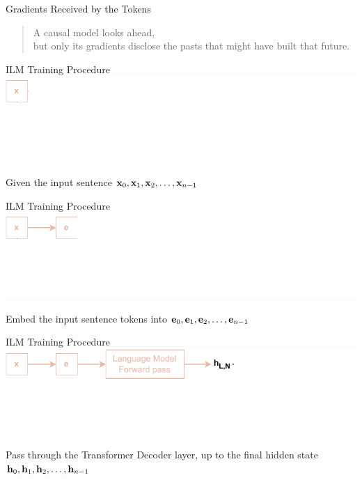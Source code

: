 
\begin{frame}{Gradients Received by the Tokens}
    \begin{quote}
        \centering
        A causal model looks ahead, \\ but only its gradients disclose the pasts that might have built that future.
    \end{quote}
\end{frame}

\begin{frame}{ILM Training Procedure}
    \includegraphics[width=\linewidth]{assets/grad_lm_head_parallelism_0.drawio.pdf}
    \vspace{1.5cm}
    
    \centering
    Given the input sentence $\mathbf{x}_0, \mathbf{x}_1, \mathbf{x}_2, \dots, \mathbf{x}_{n-1}$
\end{frame}

\begin{frame}[noframenumbering]{ILM Training Procedure}
    \includegraphics[width=\linewidth]{assets/grad_lm_head_parallelism_1.drawio.pdf}
    \vspace{1.5cm}
    
    \centering
    Embed the input sentence tokens into $\mathbf{e}_0, \mathbf{e}_1, \mathbf{e}_2, \dots, \mathbf{e}_{n-1}$
\end{frame}

\begin{frame}[noframenumbering]{ILM Training Procedure}
    \includegraphics[width=\linewidth]{assets/grad_lm_head_parallelism_2.drawio.pdf}
    \vspace{1.5cm}
    
    \centering
    Pass through the Transformer Decoder layer, up to the final hidden state $\mathbf{h}_0, \mathbf{h}_1, \mathbf{h}_2, \dots, \mathbf{h}_{n-1}$
\end{frame}

